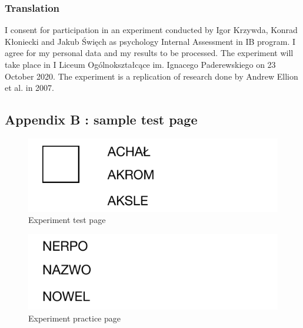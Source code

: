 \documentclass[12pt, a4]{article}
\begin{document}
\subsubsection*{Translation}
I consent for participation in an experiment conducted by Igor Krzywda, Konrad Kłoniecki and Jakub Święch as psychology Internal Assessment in IB program. I agree for my personal 
data and my results to be processed. The experiment will take place in I Liceum Ogólnokształcące im. Ignacego Paderewskiego on 23 October 2020. The experiment is a replication of
research done by Andrew Ellion et al. in 2007.
\subsection*{Appendix B : sample test page}
\begin{figure}[H]
\centering
    \caption{Experiment test page}
    \includegraphics[width=\linewidth]{exp_test}
\end{figure}
\begin{figure}[H]
\centering
    \caption{Experiment practice page}
    \includegraphics[width=\linewidth]{exp_pr}
\end{figure}
\end{document}
